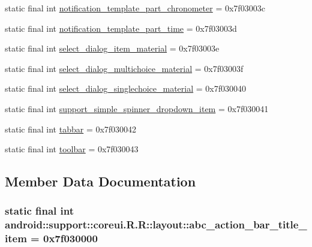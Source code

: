 \begin{CompactItemize}
static final int \hyperlink{classandroid_1_1support_1_1coreui_1_1_r_1_1layout_eb3940ac554653f242669eb8320eeecf}{notification\_\-template\_\-part\_\-chronometer} = 0x7f03003c
\item 
static final int \hyperlink{classandroid_1_1support_1_1coreui_1_1_r_1_1layout_96938ddbd37bf9f02ba0c20075ccb75f}{notification\_\-template\_\-part\_\-time} = 0x7f03003d
\item 
static final int \hyperlink{classandroid_1_1support_1_1coreui_1_1_r_1_1layout_9c22992d65db8f1b8ce1455f479d722e}{select\_\-dialog\_\-item\_\-material} = 0x7f03003e
\item 
static final int \hyperlink{classandroid_1_1support_1_1coreui_1_1_r_1_1layout_4e215bf1dc6a58be05cf431412a545fd}{select\_\-dialog\_\-multichoice\_\-material} = 0x7f03003f
\item 
static final int \hyperlink{classandroid_1_1support_1_1coreui_1_1_r_1_1layout_07f97216aea0cef9eedeafb84eea1c6c}{select\_\-dialog\_\-singlechoice\_\-material} = 0x7f030040
\item 
static final int \hyperlink{classandroid_1_1support_1_1coreui_1_1_r_1_1layout_4b1a8c2a76783fe27a6af43dfcb89ce9}{support\_\-simple\_\-spinner\_\-dropdown\_\-item} = 0x7f030041
\item 
static final int \hyperlink{classandroid_1_1support_1_1coreui_1_1_r_1_1layout_ac86987dc3cea191ed21de60b67f727a}{tabbar} = 0x7f030042
\item 
static final int \hyperlink{classandroid_1_1support_1_1coreui_1_1_r_1_1layout_b1fe144172c1ed45d5c04c72b2ec26a2}{toolbar} = 0x7f030043
\end{CompactItemize}


\subsection{Member Data Documentation}
\hypertarget{classandroid_1_1support_1_1coreui_1_1_r_1_1layout_8e82ce1563cab50fbb9c4512fcf3a3a0}{
\subsubsection[{abc\_\-action\_\-bar\_\-title\_\-item}]{\setlength{\rightskip}{0pt plus 5cm}static final int android::support::coreui.R.R::layout::abc\_\-action\_\-bar\_\-title\_\-item = 0x7f030000}}
\label{classandroid_1_1support_1_1coreui_1_1_r_1_1layout_8e82ce1563cab50fbb9c4512fcf3a3a0}


